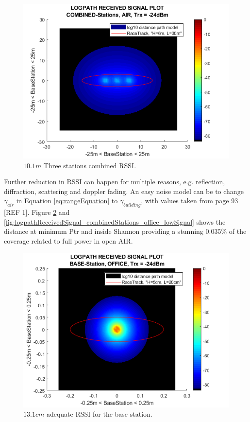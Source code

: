 \begin{figure}[H]
	\centering
	\includegraphics[width=\linewidth]{theory/pathLoss/fig/logpathReceivedSignal_combinedStations_air_lowSignal.png}
	\caption{$10.1m$ Three stations combined RSSI.}
	\label{fig:logpathReceivedSignal_combinedStations_air_lowSignal}
\end{figure}


Further reduction in RSSI can happen for multiple reasons, e.g. reflection, diffraction, scattering and doppler fading. An easy noise model can be to change $\gamma_{air}$ in Equation \ref{eq:rangeEquation} to $\gamma_{building}$, with values taken from page 93 [REF 1]. Figure \ref{fig:logpathReceivedSignal_baseStation_office_lowSignal} and \ref{fig:logpathReceivedSignal_combinedStations_office_lowSignal} shows the distance at minimum Ptr and inside Shannon providing a stunning $0.035\%$ of the coverage related to full power in open AIR.

\begin{figure}[H]
	\centering
	\includegraphics[width=\linewidth]{theory/pathLoss/fig/logpathReceivedSignal_baseStation_office_lowSignal.png}
	\caption{$13.1cm$ adequate RSSI for the base station.}
	\label{fig:logpathReceivedSignal_baseStation_office_lowSignal}
\end{figure}

